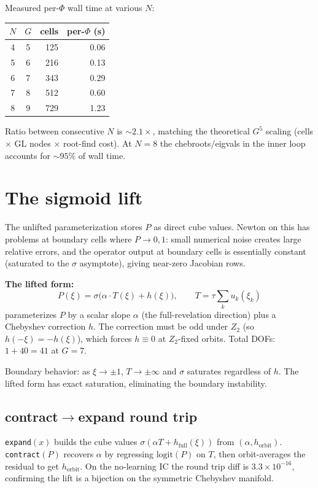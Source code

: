 \documentclass[11pt]{article}
\begin{document}
Measured per-$\Phi$ wall time at various $N$:

\begin{center}\begin{tabular}{ccrr}\toprule
$N$ & $G$ & cells & per-$\Phi$ (s) \\\midrule
4 & 5 & 125 & 0.06 \\
5 & 6 & 216 & 0.13 \\
6 & 7 & 343 & 0.29 \\
7 & 8 & 512 & 0.60 \\
8 & 9 & 729 & 1.23 \\
\bottomrule\end{tabular}\end{center}

Ratio between consecutive $N$ is $\sim 2.1\times$, matching the theoretical $G^5$ scaling
(cells $\times$ GL nodes $\times$ root-find cost). At $N=8$ the chebroots/eigvals
in the inner loop accounts for $\sim 95\%$ of wall time.

\section{The sigmoid lift}\label{sec:lift}

The unlifted parameterization stores $P$ as direct cube values. Newton on this has
problems at boundary cells where $P\to 0,1$: small numerical noise creates large
relative errors, and the operator output at boundary cells is essentially constant
(saturated to the $\sigma$ asymptote), giving near-zero Jacobian rows.

\textbf{The lifted form:}
\[
P(\xi) = \sigma\bigl(\alpha\cdot T(\xi) + h(\xi)\bigr),\qquad T = \tau\sum_k u_k(\xi_k)
\]
parameterizes $P$ by a scalar slope $\alpha$ (the full-revelation direction) plus a
Chebyshev correction $h$. The correction must be odd under $Z_2$ (so $h(-\xi) = -h(\xi)$),
which forces $h\equiv 0$ at $Z_2$-fixed orbits. Total DOFs: $1 + 40 = 41$ at $G=7$.

Boundary behavior: as $\xi\to\pm 1$, $T\to\pm\infty$ and $\sigma$ saturates regardless
of $h$. The lifted form has exact saturation, eliminating the boundary instability.

\subsection{contract$\to$expand round trip}

\texttt{expand}$(x)$ builds the cube values $\sigma(\alpha T + h_{\mathrm{full}}(\xi))$
from $(\alpha, h_{\mathrm{orbit}})$. \texttt{contract}$(P)$ recovers $\alpha$ by regressing
$\mathrm{logit}(P)$ on $T$, then orbit-averages the residual to get $h_{\mathrm{orbit}}$.
On the no-learning IC the round trip diff is $3.3\times 10^{-16}$, confirming the lift
is a bijection on the symmetric Chebyshev manifold.
\end{document}

